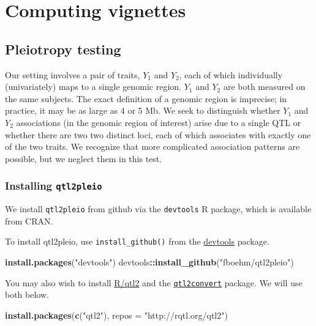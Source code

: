 \documentclass[oneside]{book}\usepackage[]{graphicx}\usepackage[]{color}
\newenvironment{Shaded}{\begin{snugshade}}{\end{snugshade}}
\newcommand{\DataTypeTok}[1]{\textcolor[rgb]{0.13,0.29,0.53}{#1}}
\newcommand{\KeywordTok}[1]{\textcolor[rgb]{0.13,0.29,0.53}{\textbf{#1}}}
\newcommand{\NormalTok}[1]{#1}
\newcommand{\OperatorTok}[1]{\textcolor[rgb]{0.81,0.36,0.00}{\textbf{#1}}}
\newcommand{\StringTok}[1]{\textcolor[rgb]{0.31,0.60,0.02}{#1}}
\begin{document}

\chapter{Computing vignettes}


\section{Pleiotropy testing}


Our setting involves a pair of traits, \(Y_1\) and \(Y_2\), each of
which individually (univariately) maps to a single genomic region.
\(Y_1\) and \(Y_2\) are both measured on the same subjects. The exact
definition of a genomic region is imprecise; in practice, it may be as
large as 4 or 5 Mb. We seek to distinguish whether \(Y_1\) and \(Y_2\)
associations (in the genomic region of interest) arise due to a single
QTL or whether there are two two distinct loci, each of which associates
with exactly one of the two traits. We recognize that more complicated
association patterns are possible, but we neglect them in this test.

\hypertarget{installing-qtl2pleio}{%
\subsection{\texorpdfstring{Installing
\texttt{qtl2pleio}}{Installing qtl2pleio}}\label{installing-qtl2pleio}}

We install \texttt{qtl2pleio} from github via the \texttt{devtools} R
package, which is available from CRAN.

To install qtl2pleio, use \texttt{install\_github()} from the
\href{https://devtools.r-lib.org}{devtools} package.

\begin{Shaded}
\begin{Highlighting}[]
\KeywordTok{install.packages}\NormalTok{(}\StringTok{"devtools"}\NormalTok{)}
\NormalTok{devtools}\OperatorTok{::}\KeywordTok{install_github}\NormalTok{(}\StringTok{"fboehm/qtl2pleio"}\NormalTok{)}
\end{Highlighting}
\end{Shaded}

You may also wish to install \href{https://kbroman.org/qtl2}{R/qtl2} and
the \href{https://github.com/rqtl/qtl2convert}{\texttt{qtl2convert}}
package. We will use both below.

\begin{Shaded}
\begin{Highlighting}[]
\KeywordTok{install.packages}\NormalTok{(}\KeywordTok{c}\NormalTok{(}\StringTok{"qtl2"}\NormalTok{), }\DataTypeTok{repos =} \StringTok{"http://rqtl.org/qtl2"}\NormalTok{)}
\end{Highlighting}
\end{Shaded}
\end{document}
